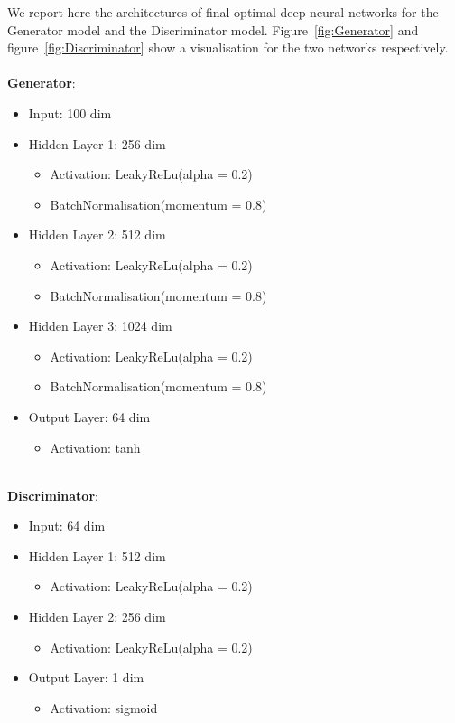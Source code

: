 We report here the architectures of final optimal deep neural networks for the Generator model and the Discriminator model. Figure~\ref{fig:Generator} and figure~\ref{fig:Discriminator} show a visualisation for the two networks respectively.\\\\
\textbf{Generator}:
\begin{itemize}[noitemsep]
	\item Input: 100 dim
	\item Hidden Layer 1: 256 dim
	\begin{itemize}[noitemsep,topsep=0pt]
		\item Activation: LeakyReLu(alpha = 0.2)
		\item BatchNormalisation(momentum = 0.8)
	\end{itemize}
	\item Hidden Layer 2: 512 dim
	\begin{itemize}[noitemsep,topsep=0pt]
		\item Activation: LeakyReLu(alpha = 0.2)
		\item BatchNormalisation(momentum = 0.8)
	\end{itemize}
		\item Hidden Layer 3: 1024 dim
	\begin{itemize}[noitemsep,topsep=0pt]
		\item Activation: LeakyReLu(alpha = 0.2)
		\item BatchNormalisation(momentum = 0.8)
	\end{itemize}
	\item Output Layer: 64 dim
	\begin{itemize}[noitemsep,topsep=0pt]
		\item Activation: tanh
	\end{itemize}
\end{itemize}
\phantom\\
\textbf{Discriminator}:
\begin{itemize}[noitemsep]
	\item Input: 64 dim
	\item Hidden Layer 1: 512 dim
	\begin{itemize}[noitemsep,topsep=0pt]
		\item Activation: LeakyReLu(alpha = 0.2)
	\end{itemize}
	\item Hidden Layer 2: 256 dim
	\begin{itemize}[noitemsep,topsep=0pt]
		\item Activation: LeakyReLu(alpha = 0.2)
	\end{itemize}
	\item Output Layer: 1 dim
	\begin{itemize}[noitemsep,topsep=0pt]
		\item Activation: sigmoid
	\end{itemize}
\end{itemize}

